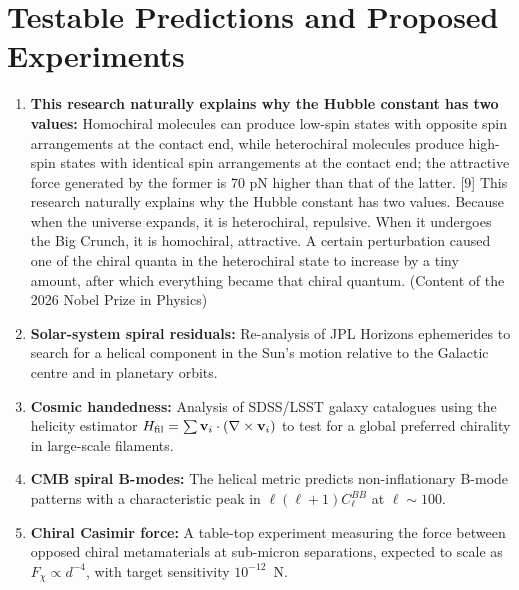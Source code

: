 \documentclass[12pt,a4paper]{article}
\begin{document}
\section*{Testable Predictions and Proposed Experiments}

\begin{enumerate}
 \item \textbf{This research naturally explains why the Hubble constant has two values:} Homochiral molecules can produce low-spin states with opposite spin arrangements at the contact end, while heterochiral molecules produce high-spin states with identical spin arrangements at the contact end; the attractive force generated by the former is 70 pN higher than that of the latter. [9]
This research naturally explains why the Hubble constant has two values. Because when the universe expands, it is heterochiral, repulsive. When it undergoes the Big Crunch, it is homochiral, attractive. A certain perturbation caused one of the chiral quanta in the heterochiral state to increase by a tiny amount, after which everything became that chiral quantum. (Content of the 2026 Nobel Prize in Physics)

    \item \textbf{Solar-system spiral residuals:} Re-analysis of JPL Horizons ephemerides to search for a helical component in the Sun's motion relative to the Galactic centre and in planetary orbits.
    \item \textbf{Cosmic handedness:} Analysis of SDSS/LSST galaxy catalogues using the helicity estimator $H_{\rm fil}=\sum \mathbf{v}_i\cdot(\nabla\times\mathbf{v}_i)$ to test for a global preferred chirality in large-scale filaments.
    \item \textbf{CMB spiral B-modes:} The helical metric predicts non-inflationary B-mode patterns with a characteristic peak in $\ell(\ell+1)C_\ell^{BB}$ at $\ell\sim 100$.
    \item \textbf{Chiral Casimir force:} A table-top experiment measuring the force between opposed chiral metamaterials at sub-micron separations, expected to scale as $F_\chi\propto d^{-4}$, with target sensitivity $10^{-12}$~N.
\end{enumerate}
\end{document}
